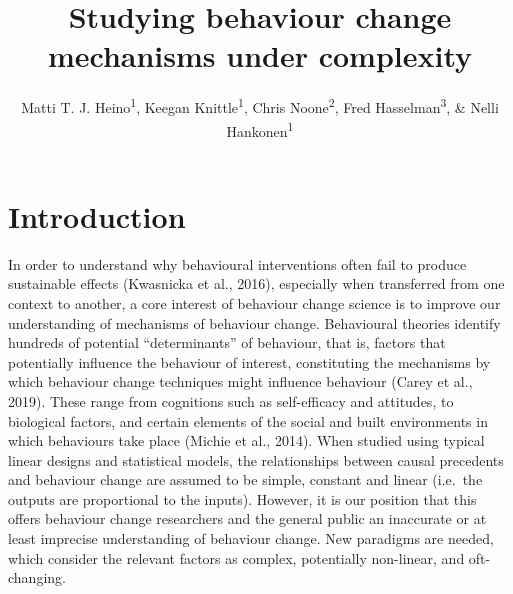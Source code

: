 \documentclass[
  british,
  man,floatsintext]{apa6}
\author{Matti T. J. Heino\textsuperscript{1}, Keegan Knittle\textsuperscript{1}, Chris Noone\textsuperscript{2}, Fred Hasselman\textsuperscript{3}, \& Nelli Hankonen\textsuperscript{1}}
\affiliation{
\vspace{0.5cm}
\textsuperscript{1} Faculty of Social Sciences, University of Helsinki, PO Box 54, 00014 University of Helsinki, Finland\\\textsuperscript{2} \\\textsuperscript{3} }
\title{Studying behaviour change mechanisms under complexity}
\date{}
\begin{document}
\maketitle

\newpage

\hypertarget{introduction}{%
\section{Introduction}\label{introduction}}

In order to understand why behavioural interventions often fail to produce sustainable effects (Kwasnicka et al., 2016), especially when transferred from one context to another, a core interest of behaviour change science is to improve our understanding of mechanisms of behaviour change. Behavioural theories identify hundreds of potential \enquote{determinants} of behaviour, that is, factors that potentially influence the behaviour of interest, constituting the mechanisms by which behaviour change techniques might influence behaviour (Carey et al., 2019). These range from cognitions such as self-efficacy and attitudes, to biological factors, and certain elements of the social and built environments in which behaviours take place (Michie et al., 2014). When studied using typical linear designs and statistical models, the relationships between causal precedents and behaviour change are assumed to be simple, constant and linear (i.e.~the outputs are proportional to the inputs). However, it is our position that this offers behaviour change researchers and the general public an inaccurate or at least imprecise understanding of behaviour change. New paradigms are needed, which consider the relevant factors as complex, potentially non-linear, and oft-changing.
\end{document}
